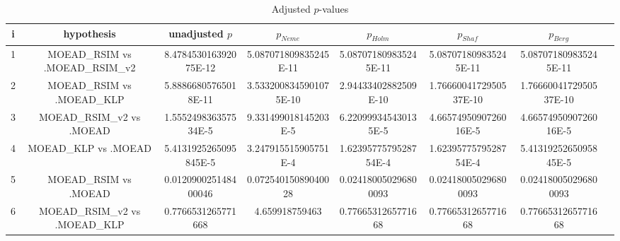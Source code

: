 \documentclass[a4paper,10pt]{article}
\begin{document}
\begin{landscape}
\begin{table}[!htp]
\centering\tiny
\caption{Adjusted $p$-values}
\begin{tabular}{cccccccc}
i&hypothesis&unadjusted $p$&$p_{Neme}$&$p_{Holm}$&$p_{Shaf}$&$p_{Berg}$\\
\hline
1&MOEAD_RSIM vs .MOEAD_RSIM_v2&8.478453016392075E-12&5.087071809835245E-11&5.087071809835245E-11&5.087071809835245E-11&5.087071809835245E-11\\
2&MOEAD_RSIM vs .MOEAD_KLP&5.88866805765018E-11&3.5332008345901075E-10&2.94433402882509E-10&1.7666004172950537E-10&1.7666004172950537E-10\\
3&MOEAD_RSIM_v2 vs .MOEAD&1.555249836357534E-5&9.331499018145203E-5&6.220999345430135E-5&4.6657495090726016E-5&4.6657495090726016E-5\\
4&MOEAD_KLP vs .MOEAD&5.4131925265095845E-5&3.247915515905751E-4&1.6239577579528754E-4&1.6239577579528754E-4&5.4131925265095845E-5\\
5&MOEAD_RSIM vs .MOEAD&0.012090025148400046&0.07254015089040028&0.024180050296800093&0.024180050296800093&0.024180050296800093\\
6&MOEAD_RSIM_v2 vs .MOEAD_KLP&0.7766531265771668&4.659918759463&0.7766531265771668&0.7766531265771668&0.7766531265771668\\
\hline
\end{tabular}
\end{table}

\end{landscape}
\end{document}
